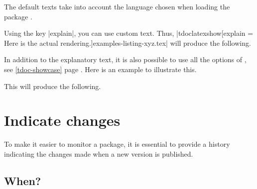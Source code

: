 \begin{tdocnote}
    The default texts take into account the language chosen when loading the package \thispack{}.
\end{tdocnote}




\begin{tdocexa}
    Using the key \tdocinlatex|explain|, you can use custom text. Thus, \tdocinlatex|tdoclatexshow[explain = Here is the actual rendering.]{examples-listing-xyz.tex}| will produce the following.

    \medskip

    \begin{tdoc-doc-showcase}

    \end{tdoc-doc-showcase}
\end{tdocexa}




\begin{tdocexa}
    In addition to the explanatory text, it is also possible to use all the options of , see \ref{tdoc-showcase} page \pageref{tdoc-showcase}.
    Here is an example to illustrate this.

    \medskip



    \medskip

    This will produce the following.

    \medskip

    \begin{tdoc-doc-showcase}
        

    \end{tdoc-doc-showcase}
\end{tdocexa}


\section{Indicate changes}

To make it easier to monitor a package, it is essential to provide a history indicating the changes made when a new version is published.



\subsection{When?}


